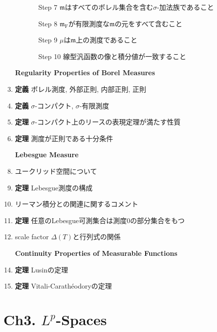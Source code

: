 \documentclass[a4paper,18pt]{jsarticle}
\begin{document}
\begin{enumerate}
\begin{enumerate}
\begin{enumerate}
      \item[Step 7 ] $\mathfrak{m}$はすべてのボレル集合を含む$\sigma$-加法族であること
      \item[Step 8 ] $\mathfrak{m}_{\mathrm{F}}$が有限測度な$\mathfrak{m}$の元をすべて含むこと
      \item[Step 9 ] $\mu$は$\mathfrak{m}$上の測度であること
      \item[Step 10] 線型汎函数の像と積分値が一致すること
    \end{enumerate}
  \end{enumerate}
  \item[] \hspace{-8mm}\textbf{Regularity Properties of Borel Measures}
  \item \textbf{定義} ボレル測度, 外部正則, 内部正則, 正則
  \item \textbf{定義} $\sigma$-コンパクト, $\sigma$-有限測度
  \item \textbf{定理} $\sigma$-コンパクト上のリースの表現定理が満たす性質
  \item \textbf{定理} 測度が正則である十分条件
  \item[] \hspace{-8mm}\textbf{Lebesgue Measure}
  \item ユークリッド空間について
  \item \textbf{定理} Lebesgue測度の構成
  \item リーマン積分との関連に関するコメント
  \item \textbf{定理} 任意のLebesgue可測集合は測度0の部分集合をもつ
  \item scale factor $\Delta(T)$と行列式の関係
  \item[] \hspace{-8mm} \textbf{Continuity Properties of Measurable Functions}
  \item \textbf{定理} Lusinの定理
  \item \textbf{定理} Vitali-Carathéodoryの定理
\end{enumerate}


\section*{Ch3. $L^p$-Spaces}
\end{document}
